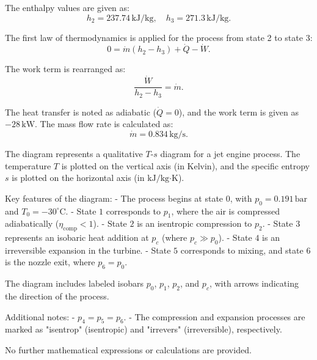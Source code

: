 The enthalpy values are given as:  
\[
h_2 = 237.74 \, \text{kJ/kg}, \quad h_3 = 271.3 \, \text{kJ/kg}.
\]  

The first law of thermodynamics is applied for the process from state 2 to state 3:  
\[
0 = \dot{m}(h_2 - h_3) + \dot{Q} - \dot{W}.
\]  

The work term is rearranged as:  
\[
\frac{\dot{W}}{h_2 - h_3} = \dot{m}.
\]  

The heat transfer is noted as adiabatic (\( \dot{Q} = 0 \)), and the work term is given as \( -28 \, \text{kW} \). The mass flow rate is calculated as:  
\[
\dot{m} = 0.834 \, \text{kg/s}.
\]

The diagram represents a qualitative \( T \)-\( s \) diagram for a jet engine process. The temperature \( T \) is plotted on the vertical axis (in Kelvin), and the specific entropy \( s \) is plotted on the horizontal axis (in \( \text{kJ}/\text{kg·K} \)).  

Key features of the diagram:  
- The process begins at state \( 0 \), with \( p_0 = 0.191 \, \text{bar} \) and \( T_0 = -30^\circ\text{C} \).  
- State \( 1 \) corresponds to \( p_1 \), where the air is compressed adiabatically (\( \eta_{\text{comp}} < 1 \)).  
- State \( 2 \) is an isentropic compression to \( p_2 \).  
- State \( 3 \) represents an isobaric heat addition at \( p_c \) (where \( p_c \gg p_0 \)).  
- State \( 4 \) is an irreversible expansion in the turbine.  
- State \( 5 \) corresponds to mixing, and state \( 6 \) is the nozzle exit, where \( p_6 = p_0 \).  

The diagram includes labeled isobars \( p_0 \), \( p_1 \), \( p_2 \), and \( p_c \), with arrows indicating the direction of the process.  

Additional notes:  
- \( p_4 = p_5 = p_6 \).  
- The compression and expansion processes are marked as "isentrop" (isentropic) and "irrevers" (irreversible), respectively.  

No further mathematical expressions or calculations are provided.